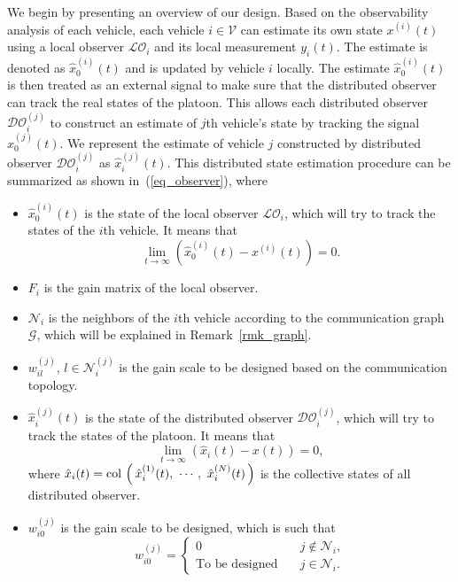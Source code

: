 \documentclass[letterpaper, 10pt, conference]{ieeeconf}  %
\def\col#1{\mathop{{\rm col}\,\left(\,#1\,\right)}}
\def\eqref#1{(\ref{#1})}
\def\V{\mathcal{V}} %
\def\G{\mathcal{G}} %
\def\N{\mathcal{N}} %
\def\LO{\mathcal{LO}} %
\def\DO{\mathcal{DO}} %
\begin{document}
We begin by presenting an overview of our design. 
Based on the observability analysis of each vehicle, each vehicle $i \in \V$ can estimate its own state $x^{(i)}(t)$ using a local observer $\LO_{i}$ and its local measurement $y_i(t)$. 
The estimate is denoted as $\hat{x}_{0}^{(i)}(t)$ and is updated by vehicle $i$ locally. 
The estimate $\hat{x}_{0}^{(i)}(t)$ is then treated as an external signal to make sure that the distributed observer can track the real states of the platoon.
This allows each distributed observer $\DO_i^{(j)}$ to construct an estimate of $j$th vehicle's state by tracking the signal $\hat{x}_{0}^{(j)}(t)$. 
We represent the estimate of vehicle $j$ constructed by distributed observer $\DO_i^{(j)}$ as $\hat{x}_i^{(j)}(t)$. 
This distributed state estimation procedure can be summarized as shown in~\eqref{eq_observer}, 
where 
\begin{itemize}
    \item $\hat{x}_{0}^{(i)}(t)$ is the state of the local observer $\LO_{i}$, which will try to track the states of the $i$th vehicle. It means that
    \begin{equation}
        \lim_{t \rightarrow \infty} \left( \hat{x}_{0}^{(i)}(t) - x^{(i)}(t) \right)= 0. 
        \label{eq_hatx_0}
    \end{equation}
    \item $F_{i}$ is the gain matrix of the local observer. 
    \item ${\N}_{i}$ is the neighbors of the $i$th vehicle according to the communication graph $\G$, which will be explained in Remark~\ref{rmk_graph}.
    \item {$w_{i l}^{(j)}$, $l \in \N_{i}^{(j)}$ is the gain scale to be designed based on the communication topology.}
    \item $\hat{x}^{(j)}_i(t)$ is the state of the distributed observer $\DO_{i}^{(j)}$, which will try to track the states of the platoon. It means that 
    \begin{equation}
        \lim_{t \rightarrow \infty} \left( \hat{x}_i(t) - x(t) \right)= 0,
        \label{eq_hatx_i}
    \end{equation}
    where $\hat{x}_i(t) = \col{\hat{x}^{(1)}_i(t) , \ \cdots , \ \hat{x}^{(N)}_i(t) }$ is the collective states of all distributed observer.
    \item $w_{i 0}^{(j)}$ is the gain scale to be designed, which is such that
    \begin{equation}
        w_{i 0}^{(j)} = \begin{cases}
            0 \quad &j \notin \N_{i}, \\
            \text{To be designed}  \quad &j \in \N_{i}.
        \end{cases}
    \end{equation}
\end{itemize}
\end{document}

